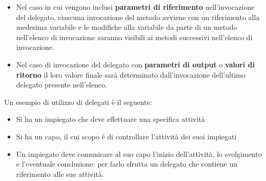 \begin{solution}
\begin{itemize}
	\item Nel caso in cui vengono inclusi \textbf{parametri di riferimento} nell'invocazione del delegato, ciascuna invocazione del metodo avviene con un riferimento alla medesima variabile e le modifiche alla variabile da parte di un metodo nell'elenco di invocazione saranno visibili ai metodi successivi nell'elenco di invocazione.
	\item Nel caso di invocazione del delegato con \textbf{parametri di output} o \textbf{valori di ritorno} il loro valore finale sarà determinato dall'invocazione dell'ultimo delegato presente nell'elenco.
\end{itemize}
Un esempio di utilizzo di delegati è il seguente:
\begin{itemize}
	\item Si ha un impiegato che deve effettuare una specifica attività
	\item Si ha un capo, il cui scopo è di controllare l'attività dei suoi impiegati
	\item Un impiegato deve comunicare al suo capo l'inizio dell'attività, lo svolgimento e l'eventuale conclusione: per farlo sfrutta un delegato che contiene un riferimento alle sue attività.
\end{itemize}
\end{solution}

